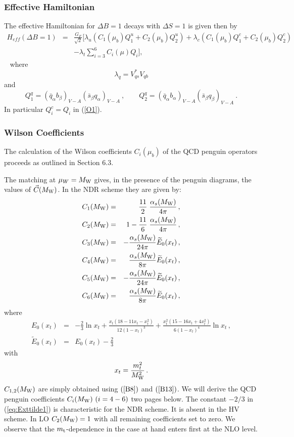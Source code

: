 \documentclass[12pt]{article}
\def\as{\alpha_s}
\newcommand{\mt}{m_{\rm t}}
\newcommand{\mw}{M_{\rm W}}
\newcommand{\be}{\begin{equation}}
\newcommand{\ee}{\end{equation}}
\begin{document}
\begin{itemize}
\begin{itemize}
\subsubsection{Effective Hamiltonian}
The effective Hamiltonian for $\Delta B=1$ decays with
$\Delta S=1$ is given then by
\begin{eqnarray}\label{HB4} 
H_{eff}(\Delta B=1) &=&
\frac{G_F}{\sqrt{2}} \Bigg[ \lambda_u(C_1(\mu_b) 
Q^u_1+C_2(\mu_b)Q^u_2) 
+\lambda_c( C_1(\mu_b) Q^c_1+C_2(\mu_b)Q^c_2)
\nonumber\\  
&& -\lambda_t \sum_{i=3}^6 C_i(\mu)Q_i \Bigg] ,
\end{eqnarray}~ 
where
\be\label{lb}
\lambda_q=V_{qs}^{*}V_{qb}
\ee
and
\be\label{Qq}
Q_1^q=(\bar q_\alpha b_\beta)_{V-A}(\bar s_\beta q_\alpha)_{V-A}~,
\quad\quad
Q_2^q=(\bar q_\alpha b_\alpha)_{V-A}(\bar s_\beta q_\beta)_{V-A}~.
\ee
In particular $Q_i^c=Q_i$ in (\ref{O1}).
\subsubsection{Wilson Coefficients}
The calculation of the Wilson coefficients $C_i(\mu_b)$ of
the QCD penguin operators proceeds as outlined in Section 6.3.

The matching at $\mu_W=\mw$ gives, in the presence of the penguin 
diagrams, the values of $\vec C(\mw)$. In the NDR scheme they 
are given by:
\begin{eqnarray}
C_1(\mw) &=&     \frac{11}{2} \; \frac{\as(\mw)}{4\pi} \, ,
\label{eq:CMw1QCD} \\
C_2(\mw) &=& 1 - \frac{11}{6} \; \frac{\as(\mw)}{4\pi} \, ,
\label{eq:CMw2QCD} \\
C_3(\mw) &=& -\frac{\as(\mw)}{24\pi} \widetilde{E}_0(x_t) \, ,
\label{eq:CMw3QCD} \\
C_4(\mw) &=& \frac{\as(\mw)}{8\pi} \widetilde{E}_0(x_t) \, ,
\label{eq:CMw4QCD} \\
C_5(\mw) &=& -\frac{\as(\mw)}{24\pi} \widetilde{E}_0(x_t) \, ,
\label{eq:CMw5QCD} \\
C_6(\mw) &=& \frac{\as(\mw)}{8\pi} \widetilde{E}_0(x_t) \, ,
\label{eq:CMw6QCD}
\end{eqnarray}
where
\begin{eqnarray}
E_0(x_t) &=& 
-\frac{2}{3} \ln x_t + \frac{x_t (18 -11 x_t - x_t^2)}{12 (1-x_t)^3} +
          \frac{x_t^2 (15 - 16 x_t  + 4 x_t^2)}{6 (1-x_t)^4} \ln x_t \, ,
\label{eq:Ext1} \\
\widetilde{E}_0(x_t) &=& E_0(x_t) - \frac{2}{3}
\label{eq:Exttilde1}
\end{eqnarray}
with
\begin{equation}
x_t = \frac{m_t^2}{\mw^2} \, .
\label{eq:xt}
\end{equation}
$C_{1,2}(\mw)$ are simply obtained using $(\ref{B8})$ and $(\ref{B13})$.
We will derive the QCD penguin coefficients $C_i(\mw)~(i=4-6)$
two pages below. The constant $-2/3$ in (\ref{eq:Exttilde1})
is characteristic for the NDR scheme. It is absent in the HV scheme.
In LO $C_2(\mw)=1$ with all remaining coefficients set to zero.
We observe that the $\mt$-dependence in the case at hand enters
first at the NLO level.


\end{itemize}
\end{itemize}
\end{document}
